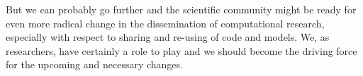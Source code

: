 \documentclass[jou]{apa6}
\begin{document}
But we can probably go further and the scientific community might be ready for even more radical change in the dissemination of computational research, especially with respect to sharing and re-using of code and models.
%
%
%
%
%
%
%
We, as researchers, have certainly a role to play and we should become the driving force for the upcoming and necessary changes.





\hspace*{1cm}
\end{document}

